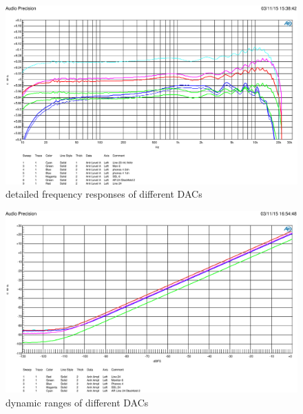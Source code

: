 \documentclass[11pt]{report}
\begin{document}
\begin{figure}[htbp]
\begin{center}
\includegraphics[width=14cm,keepaspectratio=true]{DaWandlerVergleich}
\caption{detailed frequency responses of different DACs}
\label{fig:dafreqvergleich}
\end{center}
\end{figure}

\begin{figure}[htbp]
\begin{center}
\includegraphics[width=14cm,keepaspectratio=true]{Dynamikvergleich}
\caption{dynamic ranges of different DACs}
\label{fig:dadynvergleich}
\end{center}
\end{figure}
\end{document}
